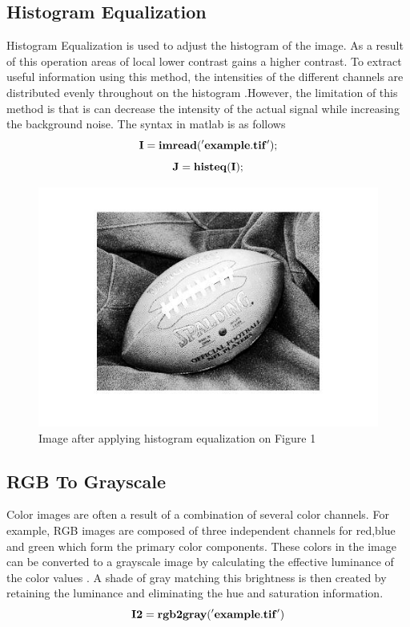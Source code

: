 \documentclass[12pt]{article}
\begin{document}
   \subsection{Histogram Equalization}
    Histogram Equalization is used to adjust the histogram of the image. As a result of this operation areas of local lower contrast gains a higher contrast. To extract useful information using this method, the intensities of the different channels are distributed evenly throughout on the histogram \cite{Mathworks3}.However, the limitation of this method is that is can decrease the intensity of the actual signal while increasing the background noise. The syntax in matlab is as follows
 \[ {\bf I = imread('example.tif');}\]
  \[{\bf J = histeq(I);}\]
       \clearpage
       \begin{figure}
       \centering
      \includegraphics[scale=0.5]{footballhisteq.jpg}
      \caption{Image after applying histogram equalization on Figure 1}
      \end{figure}

   \subsection{RGB To Grayscale}
   Color images are often a result of a combination of several color channels. For example, RGB images are composed of three independent channels for red,blue and green which form the primary color components. These colors in the image can be converted to a grayscale image by calculating the effective luminance of the color values \cite{Mathworks2}. A shade of gray matching this brightness is then created by retaining the luminance and eliminating the hue and saturation information.
  \[{\bf I2 = rgb2gray('example.tif')}\]
  
\end{document}

